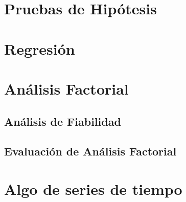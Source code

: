 \documentclass[]{book}
\begin{document}
\chapter{Pruebas de Hipótesis}\label{pruebas-de-hipotesis}

\chapter{Regresión}\label{methods}

\chapter{Análisis Factorial}\label{analisis-factorial}

\section{Análisis de Fiabilidad}\label{analisis-de-fiabilidad}

\section{Evaluación de Análisis
Factorial}\label{evaluacion-de-analisis-factorial}

\chapter{Algo de series de tiempo}\label{algo-de-series-de-tiempo}


\end{document}
